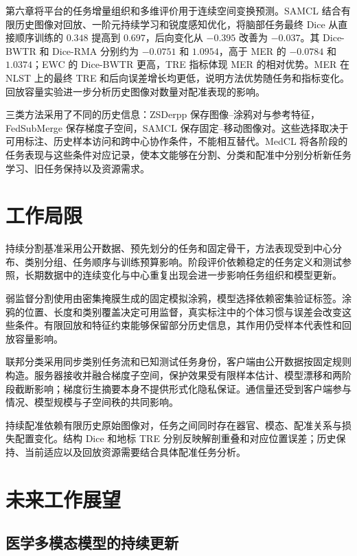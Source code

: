 第六章将平台的任务增量组织和多维评价用于连续空间变换预测。SAMCL 结合有限历史图像对回放、一阶元持续学习和锐度感知优化，将脑部任务最终 Dice 从直接顺序训练的 $0.348$ 提高到 $0.697$，后向变化从 $-0.395$ 改善为 $-0.037$。其 Dice-BWTR 和 Dice-RMA 分别约为 $-0.0751$ 和 $1.0954$，高于 MER 的 $-0.0784$ 和 $1.0374$；EWC 的 Dice-BWTR 更高，TRE 指标体现 MER 的相对优势。MER 在 NLST 上的最终 TRE 和后向误差增长均更低，说明方法优势随任务和指标变化。回放容量实验进一步分析历史图像对数量对配准表现的影响。

三类方法采用了不同的历史信息：ZSDerpp 保存图像--涂鸦对与参考特征，FedSubMerge 保存梯度子空间，SAMCL 保存固定--移动图像对。这些选择取决于可用标注、历史样本访问和跨中心协作条件，不能相互替代。MedCL 将各阶段的任务表现与这些条件对应记录，使本文能够在分割、分类和配准中分别分析新任务学习、旧任务保持以及资源需求。

\section{工作局限}
\label{sec:conclusion-limitations}

持续分割基准采用公开数据、预先划分的任务和固定骨干，方法表现受到中心分布、类别分组、任务顺序与训练预算影响。阶段评价依赖稳定的任务定义和测试参照，长期数据中的连续变化与中心重复出现会进一步影响任务组织和模型更新。

弱监督分割使用由密集掩膜生成的固定模拟涂鸦，模型选择依赖密集验证标签。涂鸦的位置、长度和类别覆盖决定可用监督，真实标注中的个体习惯与误差会改变这些条件。有限回放和特征约束能够保留部分历史信息，其作用仍受样本代表性和回放容量影响。

联邦分类采用同步类别任务流和已知测试任务身份，客户端由公开数据按固定规则构造。服务器接收并融合梯度子空间，保护效果受有限样本估计、模型漂移和两阶段截断影响；梯度衍生摘要本身不提供形式化隐私保证。通信量还受到客户端参与情况、模型规模与子空间秩的共同影响。

持续配准依赖有限历史原始图像对，任务之间同时存在器官、模态、配准关系与损失配置变化。结构 Dice 和地标 TRE 分别反映解剖重叠和对应位置误差；历史保持、当前适应以及回放资源需要结合具体配准任务分析。

\section{未来工作展望}
\label{sec:conclusion-future}

\subsection{医学多模态模型的持续更新}

